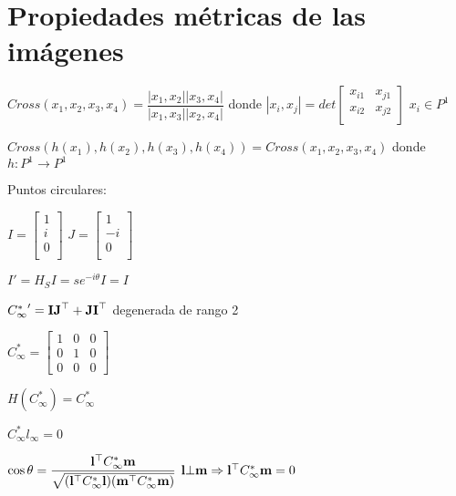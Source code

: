 \documentclass[12pt,a4paper]{article}
\begin{document}
\section{Propiedades m\'etricas de las im\'agenes}

$Cross(x_{1}, x_{2}, x_{3}, x_{4}) = \dfrac{|x_{1},x_{2}||x_{3},x_{4}|}{|x_{1},x_{3}||x_{2},x_{4}|}$ donde $|x_{i},x_{j}| = det \left[ {\begin{smallmatrix}
 x_{i1} & x_{j1}\\
 x_{i2} & x_{j2} \\
\end{smallmatrix} } \right]$ $x_{i} \in P^{1}$

$Cross(h(x_{1}), h(x_{2}), h(x_{3}), h(x_{4})) = Cross(x_{1}, x_{2}, x_{3}, x_{4})$ donde $h:P^{1} \rightarrow P^{1}$

Puntos circulares:

$I = \left[ {\begin{smallmatrix}
 1\\
 i\\
 0\\
\end{smallmatrix} } \right]$
$J = \left[ {\begin{smallmatrix}
 1\\
 -i\\
 0\\
\end{smallmatrix} } \right]$

$I' = H_{S}I = se^{-i\theta}I = I$

${C^{*}_{\infty}}' = {\bf IJ}^{\top} + {\bf JI}^{\top}$ degenerada de rango 2

$
{C^{*}_{\infty}} =
\left[ {\begin{smallmatrix}
 1 & 0 & 0 \\
 0 & 1 & 0 \\
 0 & 0 & 0
\end{smallmatrix} } \right]
$


$H({C^{*}_{\infty}}) = {C^{*}_{\infty}}$

${C^{*}_{\infty}} l_{\infty} = 0$

$\cos{\theta} = \dfrac{{\bf l}^{\top} {C^{*}_{\infty}} {\bf m}}
{\sqrt{({\bf l}^{\top} {C^{*}_{\infty}} {\bf l})({\bf m}^{\top} {C^{*}_{\infty}} {\bf m}) }}$ \hspace{2cm} ${\bf l} \bot {\bf m} \Rightarrow {\bf l}^{\top} {C^{*}_{\infty}} {\bf m} = 0$
\end{document}
